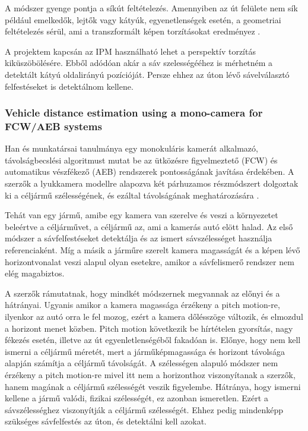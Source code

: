 A módszer gyenge pontja a síkút feltételezés. Amennyiben az út felülete
nem sík például emelkedők, lejtők vagy kátyúk, egyenetlenségek esetén, a
geometriai feltételezés sérül, ami a transzformált képen torzításokat
eredményez \cite{oliveiraMultimodalInversePerspective2015}.

A projektem kapcsán az IPM használható lehet a perspektív torzítás
kiküszöbölésére. Ebből adódóan akár a sáv szelességééhez is mérhetném a
detektált kátyú oldalirányú pozícióját. Persze ehhez az úton lévő
sávelválasztó felfestéseket is detektálnom kellene.

\subsubsection*{Vehicle distance estimation using a mono-camera for FCW/AEB systems}

Han és munkatársai tanulmánya egy monokuláris kamerát alkalmazó,
távolságbecslési algoritmust mutat be az ütközésre figyelmeztető (FCW)
és automatikus vészfékező (AEB) rendszerek pontosságának javítása
érdekében. A szerzők a lyukkamera modellre alapozva két párhuzamos
részmódszert dolgoztak ki a céljármű szélességének, és ezáltal
távolságának meghatározására \cite{hanVehicleDistanceEstimation2016}.

Tehát van egy jármű, amibe egy kamera van szerelve és veszi a
környezetet beleértve a céljárművet, a céljármű az, ami a kamerás autó
elött halad. Az első módszer a sávfelfestéseket detektálja és az ismert
sávszélességet használja referenciaként. Míg a másik a járműre szerelt
kamera magasságát és a képen lévő horizontvonalat veszi alapul olyan
esetekre, amikor a sávfelismerő rendszer nem elég magabiztos.

A szerzők rámutatnak, hogy mindkét módszernek megvannak az előnyi és a
hátrányai. Ugyanis amikor a kamera magassága érzékeny a pitch motion-re,
ilyenkor az autó orra le fel mozog, ezért a kamera dőlésszöge változik,
és elmozdul a horizont menet közben. Pitch motion következik be
hírtételen gyorsítás, nagy fékezés esetén, illetve az út
egyenletlenségéből fakadóan is. Előnye, hogy nem kell ismerni a céljármű
méretét, mert a járműképmagassága és horizont távolsága alapján számítja
a céljármű távolságát. A szélességen alapuló módszer nem érzékeny a
pitch motion-re mivel itt nem a horizonthoz viszonyítanak a szerzők,
hanem magának a céljármű szélességét veszik figyelembe. Hátránya, hogy
ismerni kellene a jármű valódi, fizikai szélességét, ez azonban
ismeretlen. Ezért a sávszélességhez viszonyítják a céljármű szélességét.
Ehhez pedig mindenképp szükséges sávfelfestés az úton, és detektálni
kell azokat.

